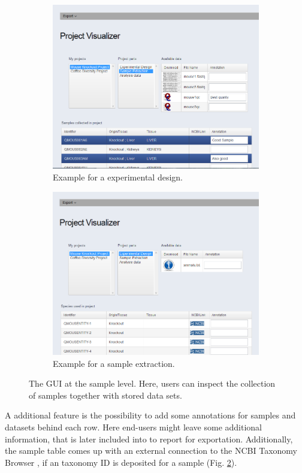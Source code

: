 \documentclass[a4paper, 11pt]{article}
\begin{document}
\begin{figure}[H]
\begin{subfigure}[b]{.45\linewidth}
\centering
\includegraphics[scale=0.30]{GUI_2.png}
\caption{{Example for a experimental design.}}
\label{fig:gui2}
\end{subfigure}%
\quad
\begin{subfigure}[b]{.45\linewidth}
\centering
\includegraphics[scale=0.30]{GUI_3.png}
\caption{{Example for a sample extraction.}}
\label{fig:gui2}
\end{subfigure}%
\caption{The GUI at the sample level. Here, users can inspect the collection of samples together with stored data sets.}
\label{fig:gui2_3}
\end{figure}
\noindent
A additional feature is the possibility to add some annotations for samples and datasets behind each row. Here end-users might leave some additional information, that is later included into to report for exportation. Additionally, the sample table comes up with an external connection to the NCBI Taxonomy Browser \cite{Sayers01012009}, if an taxonomy ID is deposited for a sample (Fig. \ref{fig:gui2}). 
\end{document}
